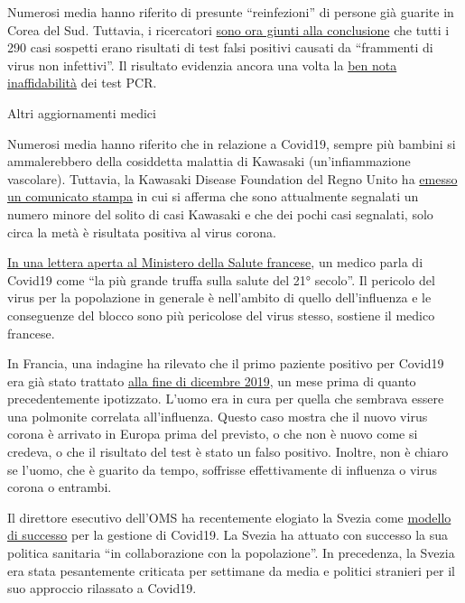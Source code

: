 Numerosi media hanno riferito di presunte ``reinfezioni'' di persone già
guarite in Corea del Sud. Tuttavia, i ricercatori
\href{https://www.independent.co.uk/news/world/asia/coronavirus-south-korea-patients-infected-twice-test-a9491986.html}{sono
ora giunti alla conclusione} che tutti i 290 casi sospetti erano
risultati di test falsi positivi causati da ``frammenti di virus non
infettivi''. Il risultato evidenzia ancora una volta la
\href{https://www.ncbi.nlm.nih.gov/pubmed/32219885}{ben nota
inaffidabilità} dei test PCR.

Altri aggiornamenti medici

Numerosi media hanno riferito che in relazione a Covid19, sempre più
bambini si ammalerebbero della cosiddetta malattia di Kawasaki
(un'infiammazione vascolare). Tuttavia, la Kawasaki Disease Foundation
del Regno Unito ha
\href{https://www.societi.org.uk/kawasaki-disease-and-covid-19/}{emesso
un comunicato stampa} in cui si afferma che sono attualmente segnalati
un numero minore del solito di casi Kawasaki e che dei pochi casi
segnalati, solo circa la metà è risultata positiva al virus corona.

\href{https://covidinfos.net/covid19/la-lettre-dun-praticien-hospitalier-adressee-au-ministere-de-la-sante-denonce-une-arnaque-sanitaire/604/}{In
una lettera aperta al Ministero della Salute francese}, un medico parla
di Covid19 come ``la più grande truffa sulla salute del 21° secolo''. Il
pericolo del virus per la popolazione in generale è nell'ambito di
quello dell'influenza e le conseguenze del blocco sono più pericolose
del virus stesso, sostiene il medico francese.

In Francia, una indagine ha rilevato che il primo paziente positivo per
Covid19 era già stato trattato
\href{https://www.reuters.com/article/us-health-coronavirus-france-retests/frances-early-covid-19-case-may-hold-clues-to-pandemics-start-idUSKBN22H15R}{alla
fine di dicembre 2019}, un mese prima di quanto precedentemente
ipotizzato. L'uomo era in cura per quella che sembrava essere una
polmonite correlata all'influenza. Questo caso mostra che il nuovo virus
corona è arrivato in Europa prima del previsto, o che non è nuovo come
si credeva, o che il risultato del test è stato un falso positivo.
Inoltre, non è chiaro se l'uomo, che è guarito da tempo, soffrisse
effettivamente di influenza o virus corona o entrambi.

Il direttore esecutivo dell'OMS ha recentemente elogiato la Svezia come
\href{https://nypost.com/2020/04/29/who-lauds-sweden-as-model-for-resisting-coronavirus-lockdown/}{modello
di successo} per la gestione di Covid19. La Svezia ha attuato con
successo la sua politica sanitaria ``in collaborazione con la
popolazione''. In precedenza, la Svezia era stata pesantemente criticata
per settimane da media e politici stranieri per il suo approccio
rilassato a Covid19.

